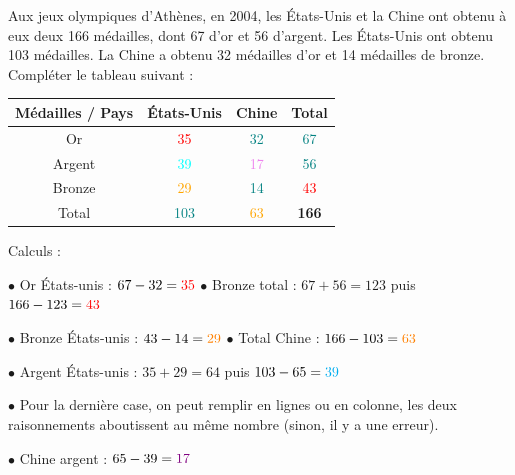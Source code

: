\documentclass[a4paper]{book}
\begin{document}
{    \begin{exercice}
        Aux jeux olympiques d'Athènes, en 2004, les États-Unis et la Chine ont obtenu à eux deux 166 médailles, dont 67 d'or et 56 d'argent. Les États-Unis ont obtenu 103 médailles. La Chine a obtenu 32 médailles d'or et 14 médailles de bronze. Compléter le tableau suivant :

        \begin{center}
            \begin{tabular}{|c|c|c|c|}
                \hline
                Médailles / Pays & États-Unis & Chine & Total \\
                \hline
                Or & \textcolor{red}{35} & \textcolor{teal}{32} & \textcolor{teal}{67} \\
                \hline
                Argent & \textcolor{cyan}{39} & \textcolor{violet}{17} & \textcolor{teal}{56}\\
                \hline
                Bronze & \textcolor{orange}{29} & \textcolor{teal}{14} & \textcolor{red}{43}\\
                \hline
                Total & \textcolor{teal}{103} & \textcolor{orange}{63} & \textbf{166} \\
                \hline
            \end{tabular}
        \end{center}

        Calculs : 

        $\bullet$ Or États-unis : $67-32=\textcolor{red}{35}$ \quad $\bullet$ Bronze total : $67+56=123$ puis $166-123=\textcolor{red}{43}$

        $\bullet$ Bronze États-unis : $43-14=\textcolor{orange}{29}$ \quad $\bullet$ Total Chine : $166-103=\textcolor{orange}{63}$
        
        $\bullet$ Argent États-unis : $35+29=64$ puis $103-65=\textcolor{cyan}{39}$

        $\bullet$ Pour la dernière case, on peut remplir en lignes ou en colonne, les deux raisonnements aboutissent au même nombre (sinon, il y a une erreur).

        $\bullet$ Chine argent : $65-39=\textcolor{violet}{17}$ 
    \end{exercice}  

}
\end{document}
